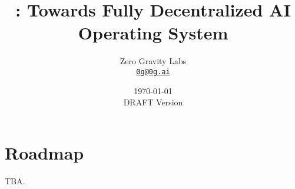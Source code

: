 \documentclass[letterpaper,11pt]{article}
\title{\LARGE \project:
	\Large Towards Fully Decentralized AI Operating System}
\author{
		Zero Gravity Labs\\
		\small\href{mailto:0g@0g.ai}
			{\nolinkurl{0g@0g.ai}}
	}
\date{\today\\\small DRAFT Version}
\begin{document}
\maketitle
\flushbottom %




\setcounter{tocdepth}{3}

\tableofcontents %

\thispagestyle{empty} %


\newpage















\section{Roadmap}

TBA.



\end{document}
